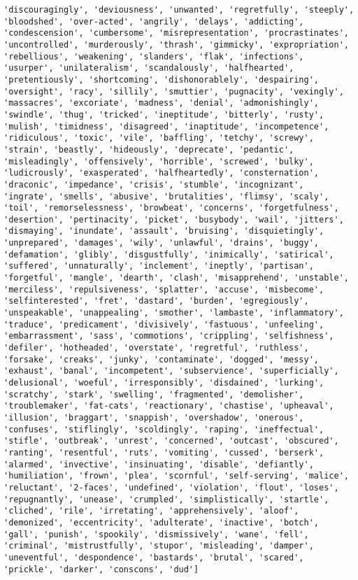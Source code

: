 \documentclass[11pt]{article}
\begin{document}
\begin{Verbatim}[commandchars=\\\{\}]
'discouragingly', 'deviousness', 'unwanted', 'regretfully', 'steeply', 'bloodshed', 'over-acted', 'angrily', 'delays', 'addicting', 'condescension', 'cumbersome', 'misrepresentation', 'procrastinates', 'uncontrolled', 'murderously', 'thrash', 'gimmicky', 'expropriation', 'rebellious', 'weakening', 'slanders', 'flak', 'infections', 'usurper', 'unilateralism', 'scandalously', 'halfhearted', 'pretentiously', 'shortcoming', 'dishonorablely', 'despairing', 'oversight', 'racy', 'sillily', 'smuttier', 'pugnacity', 'vexingly', 'massacres', 'excoriate', 'madness', 'denial', 'admonishingly', 'swindle', 'thug', 'tricked', 'ineptitude', 'bitterly', 'rusty', 'mulish', 'timidness', 'disagreed', 'inaptitude', 'incompetence', 'ridiculous', 'toxic', 'vile', 'baffling', 'tetchy', 'screwy', 'strain', 'beastly', 'hideously', 'deprecate', 'pedantic', 'misleadingly', 'offensively', 'horrible', 'screwed', 'bulky', 'ludicrously', 'exasperated', 'halfheartedly', 'consternation', 'draconic', 'impedance', 'crisis', 'stumble', 'incognizant', 'ingrate', 'smells', 'abusive', 'brutalities', 'flimsy', 'scaly', 'toil', 'remorselessness', 'browbeat', 'concerns', 'forgetfulness', 'desertion', 'pertinacity', 'picket', 'busybody', 'wail', 'jitters', 'dismaying', 'inundate', 'assault', 'bruising', 'disquietingly', 'unprepared', 'damages', 'wily', 'unlawful', 'drains', 'buggy', 'defamation', 'glibly', 'disgustfully', 'inimically', 'satirical', 'suffered', 'unnaturally', 'inclement', 'ineptly', 'partisan', 'forgetful', 'mangle', 'dearth', 'clash', 'misapprehend', 'unstable', 'merciless', 'repulsiveness', 'splatter', 'accuse', 'misbecome', 'selfinterested', 'fret', 'dastard', 'burden', 'egregiously', 'unspeakable', 'unappealing', 'smother', 'lambaste', 'inflammatory', 'traduce', 'predicament', 'divisively', 'fastuous', 'unfeeling', 'embarrassment', 'sass', 'commotions', 'crippling', 'selfishness', 'defiler', 'hotheaded', 'overstate', 'regretful', 'ruthless', 'forsake', 'creaks', 'junky', 'contaminate', 'dogged', 'messy', 'exhaust', 'banal', 'incompetent', 'subservience', 'superficially', 'delusional', 'woeful', 'irresponsibly', 'disdained', 'lurking', 'scratchy', 'stark', 'swelling', 'fragmented', 'demolisher', 'troublemaker', 'fat-cats', 'reactionary', 'chastise', 'upheaval', 'illusion', 'braggart', 'snappish', 'overshadow', 'onerous', 'confuses', 'stiflingly', 'scoldingly', 'raping', 'ineffectual', 'stifle', 'outbreak', 'unrest', 'concerned', 'outcast', 'obscured', 'ranting', 'resentful', 'ruts', 'vomiting', 'cussed', 'berserk', 'alarmed', 'invective', 'insinuating', 'disable', 'defiantly', 'humiliation', 'frown', 'plea', 'scornful', 'self-serving', 'malice', 'reluctant', '2-faces', 'undefined', 'violation', 'flout', 'loses', 'repugnantly', 'unease', 'crumpled', 'simplistically', 'startle', 'cliched', 'rile', 'irretating', 'apprehensively', 'aloof', 'demonized', 'eccentricity', 'adulterate', 'inactive', 'botch', 'gall', 'punish', 'spookily', 'dismissively', 'wane', 'fell', 'criminal', 'mistrustfully', 'stupor', 'misleading', 'damper', 'uneventful', 'despondence', 'bastards', 'brutal', 'scared', 'prickle', 'darker', 'conscons', 'dud']

    \end{Verbatim}
\end{document}

